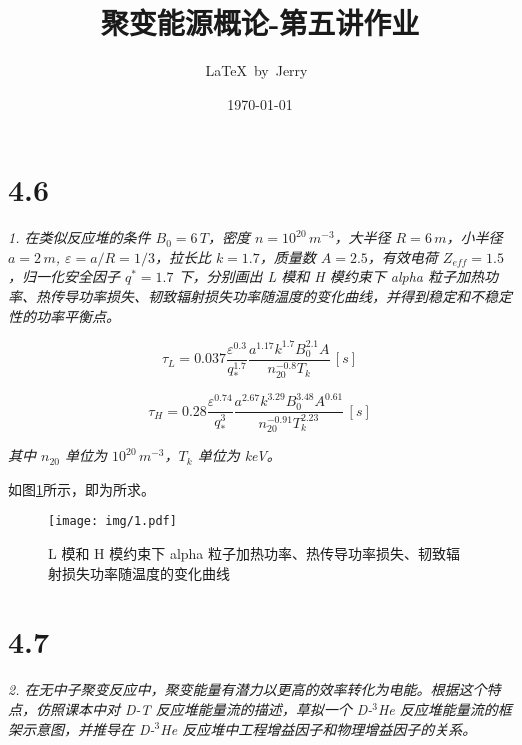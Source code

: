 \documentclass{article}
\title{聚变能源概论-第五讲作业}
\author{\LaTeX\ by\ Jerry\ }
\date{\today}
\begin{document}
\pagestyle{fancy}

\fancyhead[R]{\today}

\section*{4.6}

\emph{1. 在类似反应堆的条件 $ B_0 = 6 \, T $，密度 $ n = 10^{20} \, m^{-3} $，大半径 $ R = 6 \, m $，小半径 $ a = 2 \, m $, $ \varepsilon = a / R = 1/3 $，拉长比 $ k = 1.7 $，质量数 $ A = 2.5 $，有效电荷 $ Z_{eff} = 1.5 $，归一化安全因子 $ q^* = 1.7 $ 下，分别画出 L 模和 H 模约束下 alpha 粒子加热功率、热传导功率损失、韧致辐射损失功率随温度的变化曲线，并得到稳定和不稳定性的功率平衡点。}

$$\tau_L = 0.037 \frac{\varepsilon^{0.3}}{q_*^{1.7}} \frac{a^{1.17} k^{1.7} B_0^{2.1} A}{n_{20}^{-0.8} T_k} \, [s]$$

$$\tau_H = 0.28 \frac{\varepsilon^{0.74}}{q_*^3} \frac{a^{2.67} k^{3.29} B_0^{3.48} A^{0.61}}{n_{20}^{-0.91} T_k^{2.23}} \, [s]$$

\emph{其中 $ n_{20} $ 单位为 $ 10^{20} \, m^{-3} $，$ T_k $ 单位为 keV。}

如图\ref{fig:1}所示，即为所求。

\begin{figure}[htbp]
    \centering
    \texttt{[image: img/1.pdf]}
    \caption{L 模和 H 模约束下 alpha 粒子加热功率、热传导功率损失、韧致辐射损失功率随温度的变化曲线}
    \label{fig:1}
\end{figure}

\section*{4.7}

\emph{2. 在无中子聚变反应中，聚变能量有潜力以更高的效率转化为电能。根据这个特点，仿照课本中对 D-T 反应堆能量流的描述，草拟一个 D-${}^{3}$He 反应堆能量流的框架示意图，并推导在 D-${}^{3}$He 反应堆中工程增益因子和物理增益因子的关系。}
\end{document}
